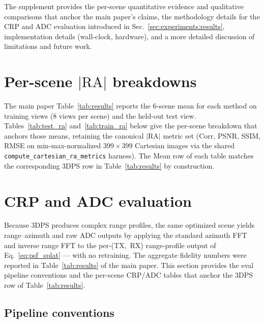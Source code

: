 \clearpage
\appendix

The supplement provides the per-scene quantitative evidence and qualitative
comparisons that anchor the main paper's claims, the methodology details for
the CRP and ADC evaluation introduced in Sec.~\ref{sec:experiments:results},
implementation details (wall-clock, hardware), and a more detailed discussion
of limitations and future work.

\section{Per-scene $|\mathrm{RA}|$ breakdowns}
\label{app:per_scene_ra}

The main paper Table~\ref{tab:results} reports the 6-scene mean for each method on training views (8 views per scene) and the held-out test view. Tables~\ref{tab:test_ra} and~\ref{tab:train_ra} below give the per-scene breakdown that anchors those means, retaining the canonical $|\mathrm{RA}|$ metric set (Corr, PSNR, SSIM, RMSE on min-max-normalized $399\!\times\!399$ Cartesian images via the shared \texttt{compute\_cartesian\_ra\_metrics} harness). The Mean row of each table matches the corresponding 3DPS row in Table~\ref{tab:results} by construction.





\section{CRP and ADC evaluation}
\label{app:rdadc}

Because 3DPS produces complex range profiles, the same optimized scene yields range--azimuth and raw ADC outputs by applying the standard azimuth FFT and inverse range FFT to the per-(TX,~RX) range-profile output of Eq.~\eqref{eq:psf_splat} --- with no retraining. The aggregate fidelity numbers were reported in Table~\ref{tab:results} of the main paper. This section provides the eval pipeline conventions and the per-scene CRP/ADC tables that anchor the 3DPS row of Table~\ref{tab:results}.

\subsection{Pipeline conventions}
\label{app:rdadc:pipeline}

